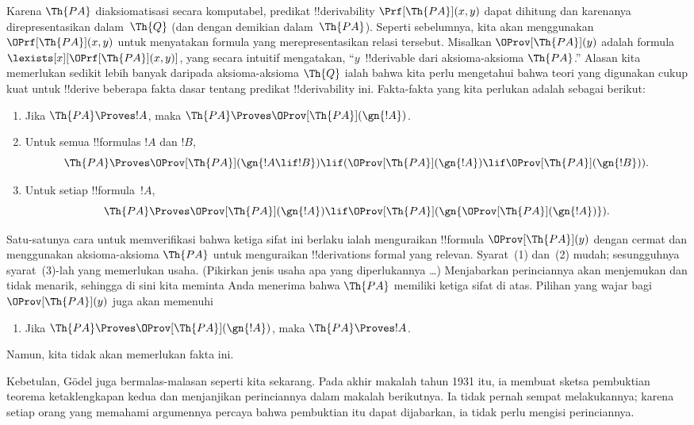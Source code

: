\documentclass[../../../include/open-logic-section]{subfiles}
\begin{document}
Karena $\Th{PA}$ diaksiomatisasi secara komputabel, predikat
!!{derivability} $\Prf[\Th{PA}](x,y)$ dapat dihitung dan karenanya
direpresentasikan dalam~$\Th{Q}$ (dan dengan demikian dalam~$\Th{PA}$).
Seperti sebelumnya, kita akan menggunakan $\OPrf[\Th{PA}](x,y)$ untuk
menyatakan formula yang merepresentasikan relasi tersebut. Misalkan
$\OProv[\Th{PA}](y)$ adalah formula
$\lexists[x][\OPrf[\Th{PA}](x,y)]$, yang secara intuitif mengatakan,
``$y$~!!{derivable} dari aksioma-aksioma $\Th{PA}$.'' Alasan kita
memerlukan sedikit lebih banyak daripada aksioma-aksioma $\Th{Q}$ ialah
bahwa kita perlu mengetahui bahwa teori yang digunakan cukup kuat untuk
!!{derive} beberapa fakta dasar tentang predikat !!{derivability} ini.
Fakta-fakta yang kita perlukan adalah sebagai berikut:
\begin{enumerate}
\item[P1.] Jika $\Th{PA} \Proves !A$, maka $\Th{PA} \Proves
  \OProv[\Th{PA}](\gn{!A})$.
\item[P2.] Untuk semua !!{formula}s $!A$ dan $!B$,
  \[
  \Th{PA} \Proves \OProv[\Th{PA}](\gn{!A \lif !B}) \lif
  (\OProv[\Th{PA}](\gn{!A}) \lif \OProv[\Th{PA}](\gn{!B})).
  \]
\item[P3.] Untuk setiap !!{formula}~$!A$,
  \[
  \Th{PA} \Proves \OProv[\Th{PA}](\gn{!A})
  \lif \OProv[\Th{PA}](\gn{\OProv[\Th{PA}](\gn{!A})}).
  \]
\end{enumerate}
Satu-satunya cara untuk memverifikasi bahwa ketiga sifat ini berlaku ialah
menguraikan !!{formula} $\OProv[\Th{PA}](y)$ dengan cermat dan menggunakan
aksioma-aksioma $\Th{PA}$ untuk menguraikan !!{derivation}s formal yang
relevan. Syarat~(1) dan~(2) mudah; sesungguhnya syarat~(3)-lah yang
memerlukan usaha. (Pikirkan jenis usaha apa yang diperlukannya \dots)
Menjabarkan perinciannya akan menjemukan dan tidak menarik, sehingga di sini
kita meminta Anda menerima bahwa $\Th{PA}$ memiliki ketiga sifat di atas.
Pilihan yang wajar bagi $\OProv[\Th{PA}](y)$ juga akan memenuhi
\begin{enumerate}
\item[P4.] Jika $\Th{PA} \Proves \OProv[\Th{PA}](\gn{!A})$, maka
  $\Th{PA} \Proves !A$.
\end{enumerate}
Namun, kita tidak akan memerlukan fakta ini.

\begin{digress}
Kebetulan, G\"odel juga bermalas-malasan seperti kita sekarang. Pada akhir
makalah tahun 1931 itu, ia membuat sketsa pembuktian teorema ketaklengkapan
kedua dan menjanjikan perinciannya dalam makalah berikutnya. Ia tidak pernah
sempat melakukannya; karena setiap orang yang memahami argumennya percaya
bahwa pembuktian itu dapat dijabarkan, ia tidak perlu mengisi perinciannya.
\end{digress}
\end{document}
